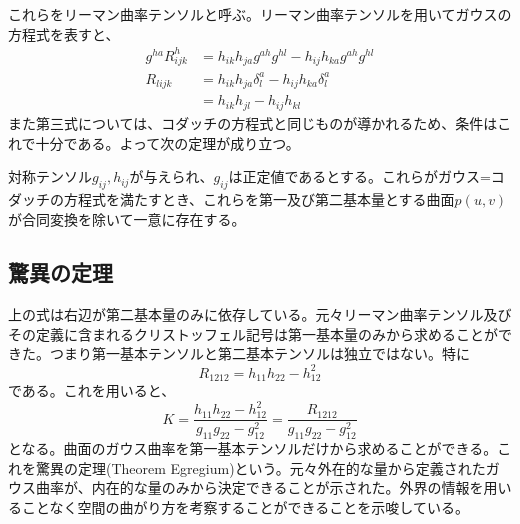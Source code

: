     これらをリーマン曲率テンソルと呼ぶ。リーマン曲率テンソルを用いてガウスの方程式を表すと、
    \begin{align*}
        g^{ha}R^h_{ijk}
            &= h_{ik}h_{ja}g^{ah}g^{hl} - h_{ij}h_{ka}g^{ah}g^{hl}\\
        R_{lijk}
            &= h_{ik}h_{ja}\delta_l^a - h_{ij}h_{ka}\delta_l^a\\
            &= h_{ik}h_{jl} - h_{ij}h_{kl}
    \end{align*}
    また第三式については、コダッチの方程式と同じものが導かれるため、条件はこれで十分である。よって次の定理が成り立つ。
    \begin{thm}[曲面論の基本定理]
        対称テンソル$g_{ij}, h_{ij}$が与えられ、$g_{ij}$は正定値であるとする。これらがガウス=コダッチの方程式を満たすとき、これらを第一及び第二基本量とする曲面$p(u, v)$が合同変換を除いて一意に存在する。
    \end{thm}

\subsection{驚異の定理}
    上の式は右辺が第二基本量のみに依存している。元々リーマン曲率テンソル及びその定義に含まれるクリストッフェル記号は第一基本量のみから求めることができた。つまり第一基本テンソルと第二基本テンソルは独立ではない。特に
        \[R_{1212} = h_{11}h_{22} - h_{12}^2\]
    である。これを用いると、
        \[K = \frac{h_{11}h_{22} - h_{12}^2}{g_{11}g_{22} - g_{12}^2} = \frac{R_{1212}}{g_{11}g_{22}-g_{12}^2}\]
    となる。曲面のガウス曲率を第一基本テンソルだけから求めることができる。これを驚異の定理(Theorem Egregium)という。元々外在的な量から定義されたガウス曲率が、内在的な量のみから決定できることが示された。外界の情報を用いることなく空間の曲がり方を考察することができることを示唆している。


